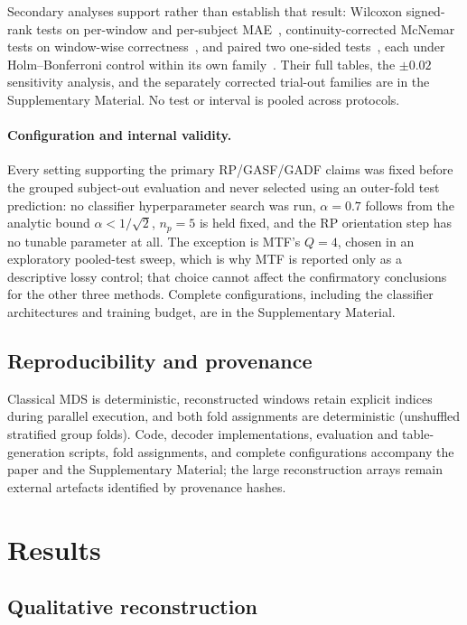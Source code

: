 \documentclass[preprint,12pt]{elsarticle}
\begin{document}
Secondary analyses support rather than establish that result: Wilcoxon signed-rank tests on per-window and per-subject MAE~\cite{Wilcoxon1945}, continuity-corrected McNemar tests on window-wise correctness~\cite{McNemar1947}, and paired two one-sided tests~\cite{Schuirmann1987}, each under Holm--Bonferroni control within its own family~\cite{Holm1979}. Their full tables, the \(\pm0.02\) sensitivity analysis, and the separately corrected trial-out families are in the Supplementary Material. No test or interval is pooled across protocols.

\paragraph{Configuration and internal validity.}
Every setting supporting the primary RP/GASF/GADF claims was fixed before the grouped subject-out evaluation and never selected using an outer-fold test prediction: no classifier hyperparameter search was run, \(\alpha=0.7\) follows from the analytic bound \(\alpha<1/\sqrt2\), \(n_p=5\) is held fixed, and the RP orientation step has no tunable parameter at all. The exception is MTF's \(Q=4\), chosen in an exploratory pooled-test sweep, which is why MTF is reported only as a descriptive lossy control; that choice cannot affect the confirmatory conclusions for the other three methods. Complete configurations, including the classifier architectures and training budget, are in the Supplementary Material.

\subsection{Reproducibility and provenance}\label{sec:reproducibility}
Classical MDS is deterministic, reconstructed windows retain explicit indices during parallel execution, and both fold assignments are deterministic (unshuffled stratified group folds). Code, decoder implementations, evaluation and table-generation scripts, fold assignments, and complete configurations accompany the paper and the Supplementary Material; the large reconstruction arrays remain external artefacts identified by provenance hashes.

\section{Results}\label{sec:results}

\subsection{Qualitative reconstruction}
\end{document}
